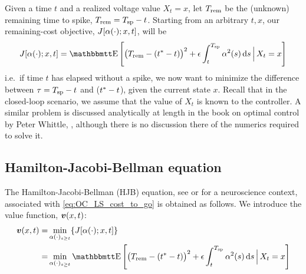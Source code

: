 \documentclass[12pt]{iopart}
\begin{document}
Given a time $t$ and a realized voltage value $X_t = x$, let ${ T_{\textrm{rem} } }$ be the
(unknown) remaining time to spike, ${ T_{\textrm{rem} } } = { T_{\textrm{sp} } } - t$. Starting from an arbitrary
$t, x$, our remaining-cost objective, $J[{\alpha}(\cdot); x,t]$, will be
\begin{equation}
J[\a(\cdot); x,t]  =
\Exp\left[
\big(\trem - (\T-t) \big)^2
+
\e \int_t^\ts  \a^2(s) \intd{s}
\,\Big|\, X_t = x
\right]
\label{eq:OC_LS_cost_to_go}
\end{equation}
i.e.\ if time $t$ has elapsed without a spike, we now want to minimize
the difference between ${\tau} = { T_{\textrm{sp} } } - t$ and (${ t^* }-t$), given the current state $x$.
Recall that in the closed-loop scenario, we assume that the value of $X_t$
is known to the controller. A similar problem is discussed analytically at
length in the book on optimal control by Peter Whittle, \cite{Whittle1996},
although there is no discussion there of the numerics required to solve it. 

\subsection{Hamilton-Jacobi-Bellman equation}
The Hamilton-Jacobi-Bellman (HJB) equation,
see \cite{Fleming1975,Whittle1996} or \cite{Danzl2009,Nabi2013a} for a neuroscience
context, associated with
\cref{eq:OC_LS_cost_to_go} is obtained as follows. We introduce the value function, ${ \boldsymbol{v} }(x,t)$:
\begin{align}
\v(x,t) =&
 \min_{\a(\cdot)_{s \geq t}}
 \{J[\a(\cdot); x,t] \}
\notag
\\
=&
\min_{\a(\cdot)_{s \geq t}}
\Exp\left[
\big(\trem - (\T-t) \big)^2
+
\e \int_t^\ts  \a^2(s) \intd{s}
\,\Big|\,X_t = x
\right]
\label{eq:OC_LS_mean_value}
\end{align}
\end{document}
